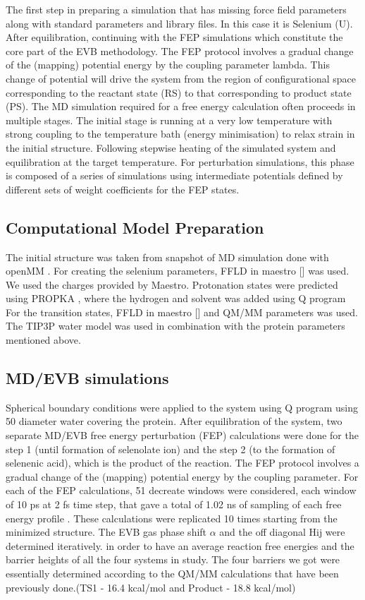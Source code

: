 \documentclass{article}
\begin{document}
The first step in preparing a simulation that has missing force field parameters along with standard parameters and library files. In this case it is Selenium (U). After equilibration, continuing with the FEP simulations which constitute the core part of the EVB methodology. The FEP protocol involves a gradual change of the (mapping) potential energy by the coupling parameter lambda. This change of potential will drive the system from the region of configurational space corresponding to the reactant state (RS) to that corresponding to product state (PS). The MD simulation required for a free energy calculation often proceeds in multiple stages. The initial stage is running at a very low temperature with strong coupling to the temperature bath (energy minimisation) to relax strain in the initial structure. Following stepwise heating of the simulated system and equilibration at the target temperature. For perturbation simulations, this phase is composed of a series of simulations using intermediate potentials defined by different sets of weight coefficients for the FEP states.


\subsection{Computational Model Preparation}
The initial structure was taken from snapshot of MD simulation done with openMM \cite{Eastman2017}. For creating the selenium parameters, FFLD in maestro [] was used. We used the charges provided by Maestro. Protonation states were predicted using PROPKA \cite{Søndergaard2011}, where the hydrogen and solvent was added using Q program \cite{Marelius1999} For the transition states, FFLD in maestro [] and QM/MM parameters was used. The TIP3P water model was used in combination with the protein parameters mentioned above.

\subsection {MD/EVB simulations}

Spherical boundary conditions \cite{King1989} were applied to the system using Q program \cite{Marelius1999} using 50 \text{\AA} diameter water covering the protein. After equilibration of the system, two separate MD/EVB free energy perturbation (FEP) calculations were done for the step 1 (until formation of selenolate ion) and the step 2 (to the formation of selenenic acid), which is the product of the reaction. The FEP protocol involves a gradual change of the (mapping) potential energy by the coupling parameter. For each of the FEP calculations, 51 decreate windows were considered, each window of 10 ps at 2 fs time step, that gave a total of 1.02 ns of sampling of each free energy profile . These calculations were replicated 10 times starting from the minimized structure. The EVB gas phase shift $\alpha$  and the off diagonal Hij were determined iteratively. in order to have an average reaction free energies and the barrier heights of all the four systems in study. The four barriers we got were essentially determined according to the QM/MM calculations that have been previously done.(TS1 - 16.4 kcal/mol and Product - 18.8 kcal/mol)
\end{document}
